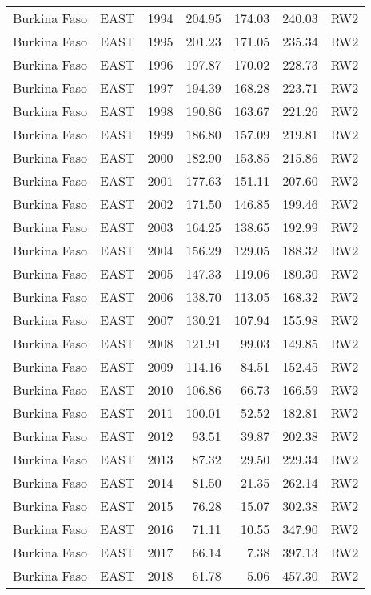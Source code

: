 \begin{longtable}{lllrrrl}
  Burkina Faso & EAST & 1994 & 204.95 & 174.03 & 240.03 & RW2 \\ 
  Burkina Faso & EAST & 1995 & 201.23 & 171.05 & 235.34 & RW2 \\ 
  Burkina Faso & EAST & 1996 & 197.87 & 170.02 & 228.73 & RW2 \\ 
  Burkina Faso & EAST & 1997 & 194.39 & 168.28 & 223.71 & RW2 \\ 
  Burkina Faso & EAST & 1998 & 190.86 & 163.67 & 221.26 & RW2 \\ 
  Burkina Faso & EAST & 1999 & 186.80 & 157.09 & 219.81 & RW2 \\ 
  Burkina Faso & EAST & 2000 & 182.90 & 153.85 & 215.86 & RW2 \\ 
  Burkina Faso & EAST & 2001 & 177.63 & 151.11 & 207.60 & RW2 \\ 
  Burkina Faso & EAST & 2002 & 171.50 & 146.85 & 199.46 & RW2 \\ 
  Burkina Faso & EAST & 2003 & 164.25 & 138.65 & 192.99 & RW2 \\ 
  Burkina Faso & EAST & 2004 & 156.29 & 129.05 & 188.32 & RW2 \\ 
  Burkina Faso & EAST & 2005 & 147.33 & 119.06 & 180.30 & RW2 \\ 
  Burkina Faso & EAST & 2006 & 138.70 & 113.05 & 168.32 & RW2 \\ 
  Burkina Faso & EAST & 2007 & 130.21 & 107.94 & 155.98 & RW2 \\ 
  Burkina Faso & EAST & 2008 & 121.91 & 99.03 & 149.85 & RW2 \\ 
  Burkina Faso & EAST & 2009 & 114.16 & 84.51 & 152.45 & RW2 \\ 
  Burkina Faso & EAST & 2010 & 106.86 & 66.73 & 166.59 & RW2 \\ 
  Burkina Faso & EAST & 2011 & 100.01 & 52.52 & 182.81 & RW2 \\ 
  Burkina Faso & EAST & 2012 & 93.51 & 39.87 & 202.38 & RW2 \\ 
  Burkina Faso & EAST & 2013 & 87.32 & 29.50 & 229.34 & RW2 \\ 
  Burkina Faso & EAST & 2014 & 81.50 & 21.35 & 262.14 & RW2 \\ 
  Burkina Faso & EAST & 2015 & 76.28 & 15.07 & 302.38 & RW2 \\ 
  Burkina Faso & EAST & 2016 & 71.11 & 10.55 & 347.90 & RW2 \\ 
  Burkina Faso & EAST & 2017 & 66.14 & 7.38 & 397.13 & RW2 \\ 
  Burkina Faso & EAST & 2018 & 61.78 & 5.06 & 457.30 & RW2 \\ 

\end{longtable}
